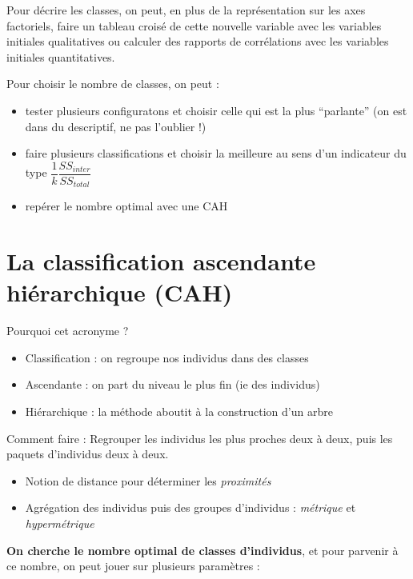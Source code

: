 \documentclass[]{book}
\providecommand{\tightlist}{%
  \setlength{\itemsep}{0pt}\setlength{\parskip}{0pt}}
\begin{document}
Pour décrire les classes, on peut, en plus de la représentation sur les axes factoriels, faire un tableau croisé de cette nouvelle variable avec les variables initiales qualitatives ou calculer des rapports de corrélations avec les variables initiales quantitatives.

Pour choisir le nombre de classes, on peut :

\begin{itemize}
\tightlist
\item
  tester plusieurs configuratons et choisir celle qui est la plus ``parlante'' (on est dans du descriptif, ne pas l'oublier !)
\item
  faire plusieurs classifications et choisir la meilleure au sens d'un indicateur du type \(\dfrac{1}{k} \dfrac{SS_{inter}}{SS_{total}}\)
\item
  repérer le nombre optimal avec une CAH
\end{itemize}

\hypertarget{la-classification-ascendante-hierarchique-cah}{%
\section{La classification ascendante hiérarchique (CAH)}\label{la-classification-ascendante-hierarchique-cah}}

Pourquoi cet acronyme ?

\begin{itemize}
\tightlist
\item
  Classification : on regroupe nos individus dans des classes
\item
  Ascendante : on part du niveau le plus fin (ie des individus)
\item
  Hiérarchique : la méthode aboutit à la construction d'un arbre
\end{itemize}

Comment faire : Regrouper les individus les plus proches deux à deux, puis les paquets d'individus deux à deux.

\begin{itemize}
\tightlist
\item
  Notion de distance pour déterminer les \emph{proximités}
\item
  Agrégation des individus puis des groupes d'individus : \emph{métrique} et \emph{hypermétrique}
\end{itemize}

\textbf{On cherche le nombre optimal de classes d'individus}, et pour parvenir à ce nombre, on peut jouer sur plusieurs paramètres :
\end{document}
